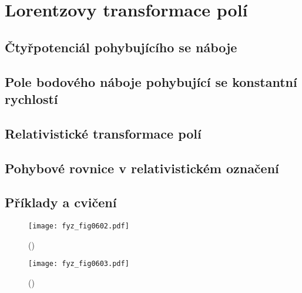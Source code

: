 \setchaptertoc
\chapter{Lorentzovy transformace polí}\label{fyz:IIchapXXVI}

  \section{Čtyřpotenciál pohybujícího se náboje}\label{fyz:IIchapXXVIsecI}
  \section{Pole bodového náboje pohybující se konstantní 
  rychlostí}\label{fyz:IIchapXXVIsecII}
  \section{Relativistické transformace polí}\label{fyz:IIchapXXVIsecIII}
  \section{Pohybové rovnice v relativistickém označení}\label{fyz:IIchapXXVIsecIV}
  \section{Příklady a cvičení}\label{fyz:IIchapXXVIsecV}



    \begin{figure}[ht!] %
      \centering
      \texttt{[image: fyz\_fig0602.pdf]}
      \caption{
               (\cite[s.~707]{Feynman02})}
      \label{fyz:fig0602}
    \end{figure}

    \begin{figure}[ht!] %
      \centering
      \texttt{[image: fyz\_fig0603.pdf]}
      \caption{
               (\cite[s.~707]{Feynman02})}
      \label{fyz:fig0603}
    \end{figure}

